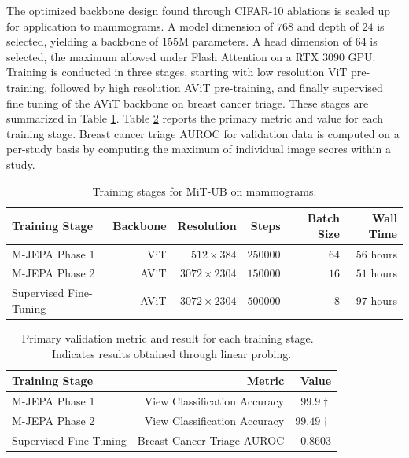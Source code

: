 \documentclass[12pt]{article}
\begin{document}
The optimized backbone design found through CIFAR-10 ablations is scaled up for application to mammograms. A model dimension of $768$ and depth of $24$
is selected, yielding a backbone of $155\mathrm{M}$ parameters. A head dimension of $64$ is selected, the maximum allowed under Flash Attention \cite{dao2022flash}
on a RTX 3090 GPU. Training is conducted in three stages, starting with low resolution ViT pre-training, followed by high resolution AViT pre-training, and finally
supervised fine tuning of the AViT backbone on breast cancer triage. These stages are summarized in Table \ref{tab:mammo-training}.
Table \ref{tab:mammo-val-metrics} reports the primary metric and value for each training stage. Breast cancer triage AUROC
for validation data is computed on a per-study basis by computing the maximum of individual image scores within a study.

\begin{table}[H]
    \centering
    \begin{tabular}{l r r r r r}
        \toprule
        Training Stage & Backbone & Resolution & Steps & Batch Size &Wall Time \\
        \midrule
        M-JEPA Phase 1 & ViT & \(512\times384\) & \(250000\) & \(64\) & \(56\) hours \\
        M-JEPA Phase 2 & AViT & \(3072\times2304\) & \(150000\) & \(16\) & \(51\) hours \\
        Supervised Fine-Tuning & AViT & \(3072\times2304\) & \(500000\) & \(8\) & \(97\) hours \\
        \bottomrule
    \end{tabular}
    \caption{Training stages for MiT-UB on mammograms.}
    \label{tab:mammo-training}
\end{table}



\begin{table}[H]
    \centering
    \begin{tabular}{l r r}
        \toprule
        Training Stage & Metric & Value \\
        \midrule
        M-JEPA Phase 1 & View Classification Accuracy & \(99.9\dagger\) \\
        M-JEPA Phase 2 & View Classification Accuracy & \(99.49\dagger\) \\
        Supervised Fine-Tuning & Breast Cancer Triage AUROC & \(0.8603\) \\
        \bottomrule
    \end{tabular}
    \caption{Primary validation metric and result for each training stage. $^\dagger$Indicates results obtained through linear probing.}
    \label{tab:mammo-val-metrics}
\end{table}
\end{document}
